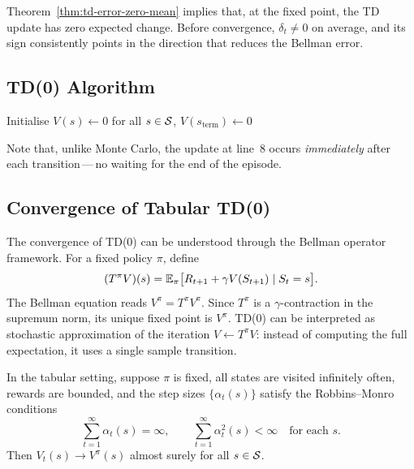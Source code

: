 Theorem~\ref{thm:td-error-zero-mean} implies that, at the fixed point, the TD update has zero expected change.  Before convergence, $\delta_t \ne 0$ on average, and its sign consistently points in the direction that reduces the Bellman error.

\subsection{TD(0) Algorithm}

\begin{algorithm}[ht]
\caption{TD(0) for Policy Evaluation}
\label{alg:td0}
\KwIn{Policy $\pi$, step size $\alpha\in(0,1]$, discount $\gamma\in[0,1)$}
Initialise $V(s) \leftarrow 0$ for all $s \in \mathcal{S}$, $V(s_{\mathrm{term}}) \leftarrow 0$\;
\end{algorithm}

Note that, unlike Monte Carlo, the update at line~8 occurs \emph{immediately} after each transition\,---\,no waiting for the end of the episode.

\subsection{Convergence of Tabular TD(0)}

The convergence of TD(0) can be understood through the Bellman operator framework.  For a fixed policy $\pi$, define
\[
(T^\pi V)(s) = \operatorname{\mathbb{E}}_\pi\bigl[R_{t+1} + \gamma V(S_{t+1}) \mid S_t = s\bigr].
\]
The Bellman equation reads $V^\pi = T^\pi V^\pi$.  Since $T^\pi$ is a $\gamma$-contraction in the supremum norm, its unique fixed point is $V^\pi$.  TD(0) can be interpreted as stochastic approximation of the iteration $V \leftarrow T^\pi V$: instead of computing the full expectation, it uses a single sample transition.

\begin{theorem}
\label{thm:td0-convergence}
In the tabular setting, suppose $\pi$ is fixed, all states are visited infinitely often, rewards are bounded, and the step sizes $\{\alpha_t(s)\}$ satisfy the Robbins--Monro conditions
\begin{equation}
\label{eq:rm-conditions}
\sum_{t=1}^{\infty}\alpha_t(s) = \infty, \qquad \sum_{t=1}^{\infty}\alpha_t^2(s) < \infty \quad \text{for each } s.
\end{equation}
Then $V_t(s) \to V^\pi(s)$ almost surely for all $s\in\mathcal{S}$.
\end{theorem}

